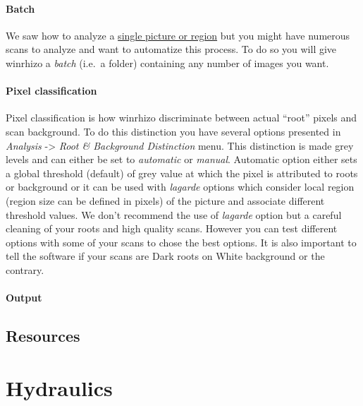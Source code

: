 \documentclass[
  12pt,
  american,
  a4paper,
  extrafontsizes,onecolumn,openright
  ]{memoir}
\begin{document}
\hypertarget{batch}{%
\subsubsection{Batch}\label{batch}}

We saw how to analyze a \protect\hyperlink{first-analysis}{single picture or region} but you might have numerous scans to analyze and want to automatize this process.
To do so you will give winrhizo a \emph{batch} (i.e.~a folder) containing any number of images you want.

\hypertarget{pixel-classification}{%
\subsubsection{Pixel classification}\label{pixel-classification}}

Pixel classification is how winrhizo discriminate between actual ``root'' pixels and scan background.
To do this distinction you have several options presented in \emph{Analysis} -\textgreater{} \emph{Root \& Background Distinction} menu.
This distinction is made grey levels and can either be set to \emph{automatic} or \emph{manual}.
Automatic option either sets a global threshold (default) of grey value at which the pixel is attributed to roots or background or it can be used with \emph{lagarde} options which consider local region (region size can be defined in pixels) of the picture and associate different threshold values.
We don't recommend the use of \emph{lagarde} option but a careful cleaning of your roots and high quality scans.
However you can test different options with some of your scans to chose the best options.
It is also important to tell the software if your scans are Dark roots on White background or the contrary.

\hypertarget{output}{%
\subsubsection{Output}\label{output}}

\hypertarget{resources}{%
\section{Resources}\label{resources}}

\hypertarget{hydraulics}{%
\chapter{Hydraulics}\label{hydraulics}}
\end{document}
